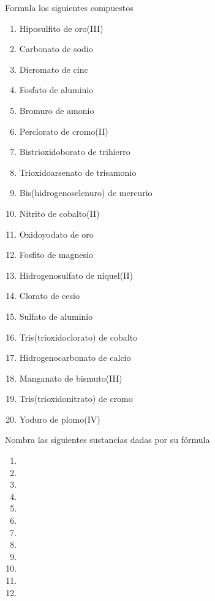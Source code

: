 \documentclass[10pt]{article}
\begin{document}
\begin{exercise}[
    tags    = {inorgánica,sales, sales ternarias, oxosales,2B},
    topics  = {química inorgánica,formulación,nomenclatura},
    source  = {Química 2B OXF 2016, p347, e12},
  ]

  Formula los siguientes compuestos

  \begin{enumerate}
    \item Hiposulfito de oro(III)
    \item Carbonato de sodio
    \item Dicromato de cinc
    \item Fosfato de aluminio
    \item Bromuro de amonio
    \item Perclorato de cromo(II)
    \item Bistrioxidoborato de trihierro
    \item Trioxidoarsenato de trisamonio
    \item Bis(hidrogenoselenuro) de mercurio
    \item Nitrito de cobalto(II)
    \item Oxidoyodato de oro
    \item Fosfito de magnesio
    \item Hidrogenosulfato de níquel(II)
    \item Clorato de cesio
    \item Sulfato de aluminio
    \item Tris(trioxidoclorato) de cobalto
    \item Hidrogenocarbonato de calcio
    \item Manganato de bismuto(III)
    \item Tris(trioxidonitrato) de cromo
    \item Yoduro de plomo(IV)
  \end{enumerate}
\end{exercise}


\begin{exercise}[
    tags    = {inorgánica,nomenclatura,múltiple,2B},
    topics  = {química inorgánica,formulación,nomenclatura},
    source  = {Química 2B SAN 2016, p372, e6},
  ]

  Nombra las siguientes sustancias dadas por su fórmula

  \begin{enumerate}
    \item {}
    \item {}
    \item {}
    \item {}
    \item {}
    \item {}
    \item {}
    \item {}
    \item {}
    \item {}
    \item {}
    \item {}
  \end{enumerate}
\end{exercise}
\end{document}
